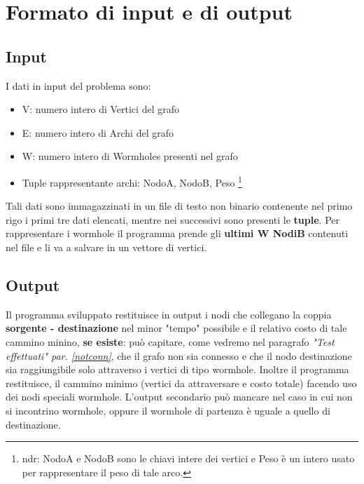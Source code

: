 \def\baselinestretch{1}
\section{Formato di input e di output}
\def\baselinestretch{1.66}
\thispagestyle{headings}

\subsection{Input}
I dati in input del problema sono:
\begin{itemize}
    \item V: numero intero di Vertici del grafo
    \item E: numero intero di Archi del grafo
    \item W: numero intero di Wormholes presenti nel grafo
    \item Tuple rappresentante archi: NodoA, NodoB, Peso
    \footnote{ndr: NodoA e NodoB sono le chiavi intere dei vertici
    e Peso \`e un intero usato per rappresentare il peso di tale
    arco.}
\end{itemize}
Tali dati sono immagazzinati in un file di testo non binario
contenente nel primo rigo i primi tre dati elencati, mentre nei
successivi sono presenti le \textbf{tuple}.
Per rappresentare i wormhole il programma prende gli \textbf{
ultimi W NodiB} contenuti nel file e li va a salvare in un
vettore di vertici.

\subsection{Output}
Il programma sviluppato restituisce in output i nodi che collegano
la coppia \textbf{sorgente - destinazione} nel minor "tempo" possibile 
e il relativo costo di tale cammino minino, \textbf{se esiste}:
pu\`o capitare, come vedremo nel paragrafo \textit{"Test effettuati" par. \ref{notconn}},
che il grafo non sia connesso e che il nodo destinazione sia raggiungibile 
solo attraverso i vertici di tipo wormhole.
Inoltre il programma restituisce, il cammino minimo (vertici da attraversare
e costo totale) facendo uso dei nodi speciali wormhole. L'output secondario
pu\`o mancare nel caso in cui non si incontrino wormhole, oppure il wormhole di partenza \`e uguale a quello di destinazione.